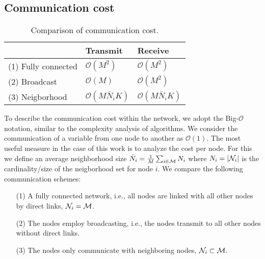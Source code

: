 \documentclass{article}
\begin{document}
\subsection[]{Communication cost}
\label{sec:transcost}
\renewcommand{\arraystretch}{1.2}
\begin{table}[t]
    \centering
    \begin{tabular}{ |l|l|l| }
        \hline
        & Transmit & Receive \\
        \hline\hline
        (1) Fully connected & \(\mathcal{O}(M^2)\) & \(\mathcal{O}(M^2)\) \\
        \hline
        (2) Broadcast & \(\mathcal{O}(M)\) & \(\mathcal{O}(M^2)\) \\ 
        \hline
        (3) Neigborhood & \(\mathcal{O}(M \bar{N}_i K)\) & \(\mathcal{O}(M \bar{N}_i K)\) \\ 
        \hline
    \end{tabular}
    \caption[]{Comparison of communication cost.}
    \label{tab:transcost:table}
\end{table}
\renewcommand{\arraystretch}{1.0}
To describe the communication cost within the network, we adopt the Big-\(\mathcal{O}\) notation, similar to the complexity analysis of algorithms.
We consider the communication of a variable from one node to another as \(\mathcal{O}(1)\).
The most useful measure in the case of this work is to analyze the cost per node.
For this we define an average neighborhood size \(\bar{N}_i = \frac{1}{M} \sum_{i \in \mathcal{M}} N_i\) where \(N_i = | \mathcal{N}_i |\) is the cardinality/size of the neigborhood set for node \(i\).
We compare the following communication schemes:
\begin{itemize}
    \itemsep-0.2em
    \item[(1)] A fully connected network, i.e., all nodes are linked with all other nodes by direct links, \(\mathcal{N}_i = \mathcal{M}\).
    \item[(2)] The nodes employ broadcasting, i.e., the nodes transmit to all other nodes without direct links.
    \item[(3)] The nodes only communicate with neighboring nodes, \(\mathcal{N}_i \subset \mathcal{M}\).
\end{itemize}
\end{document}
